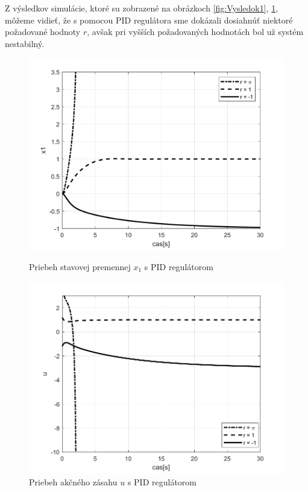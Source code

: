 \documentclass[../main.tex]{subfiles}
\begin{document}
Z výsledkov simulácie, ktoré su zobrazené na obrázkoch \ref{fig:Vysledok1}, \ref{fig:Vysledok2}, môžeme vidieť, že s pomocou PID regulátora sme dokázali dosiahnúť niektoré požadované hodnoty $r$, avšak pri vyšších požadovaných hodnotách bol už systém nestabilný.


\begin{figure}[!htb]
   \begin{minipage}{0.46\textwidth}
     \centering
     \includegraphics[width=1\linewidth]{xpid.pdf}
     \caption{Priebeh stavovej premennej $x_1$ s PID regulátorom}
	\label{fig:Vysledok1}
   \end{minipage}\hfill
   \begin{minipage}{0.46\textwidth}
     \centering
     \includegraphics[width=1\linewidth]{upid.pdf}
     \caption{Priebeh akčného zásahu $u$ s PID regulátorom}
	\label{fig:Vysledok2}
   \end{minipage}
\end{figure}
\end{document}
